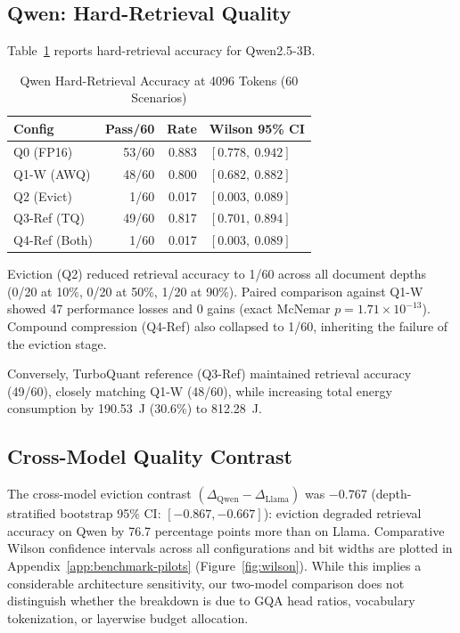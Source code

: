\documentclass[sigconf,nonacm]{acmart}
\begin{document}
\subsection{Qwen: Hard-Retrieval Quality}
\label{sec:qwen-quality}

Table~\ref{tab:qwen-quality} reports hard-retrieval accuracy for Qwen2.5-3B.

\begin{table}[htbp]
\caption{Qwen Hard-Retrieval Accuracy at 4096 Tokens (60 Scenarios)}
\label{tab:qwen-quality}
\centering\small
\begin{tabular}{lrrl}
\toprule
\textbf{Config} & \textbf{Pass/60} & \textbf{Rate} & \textbf{Wilson 95\% CI} \\
\midrule
Q0 (FP16)     & 53/60 & 0.883 & $[0.778,\ 0.942]$ \\
Q1-W (AWQ)    & 48/60 & 0.800 & $[0.682,\ 0.882]$ \\
Q2 (Evict)    & 1/60  & 0.017 & $[0.003,\ 0.089]$ \\
Q3-Ref (TQ)   & 49/60 & 0.817 & $[0.701,\ 0.894]$ \\
Q4-Ref (Both) & 1/60  & 0.017 & $[0.003,\ 0.089]$ \\
\bottomrule
\end{tabular}
\end{table}

Eviction (Q2) reduced retrieval accuracy to 1/60 across all document depths (0/20 at 10\%, 0/20 at 50\%, 1/20 at 90\%). Paired comparison against Q1-W showed 47 performance losses and 0 gains (exact McNemar $p = 1.71 \times 10^{-13}$). Compound compression (Q4-Ref) also collapsed to 1/60, inheriting the failure of the eviction stage.

Conversely, TurboQuant reference (Q3-Ref) maintained retrieval accuracy (49/60), closely matching Q1-W (48/60), while increasing total energy consumption by 190.53~J (30.6\%) to 812.28~J.

\subsection{Cross-Model Quality Contrast}

The cross-model eviction contrast $(\Delta_{\text{Qwen}} - \Delta_{\text{Llama}})$ was $-0.767$ (depth-stratified bootstrap 95\% CI: $[-0.867, -0.667]$): eviction degraded retrieval accuracy on Qwen by 76.7 percentage points more than on Llama. Comparative Wilson confidence intervals across all configurations and bit widths are plotted in Appendix~\ref{app:benchmark-pilots} (Figure~\ref{fig:wilson}). While this implies a considerable architecture sensitivity, our two-model comparison does not distinguish whether the breakdown is due to GQA head ratios, vocabulary tokenization, or layerwise budget allocation.
\end{document}
